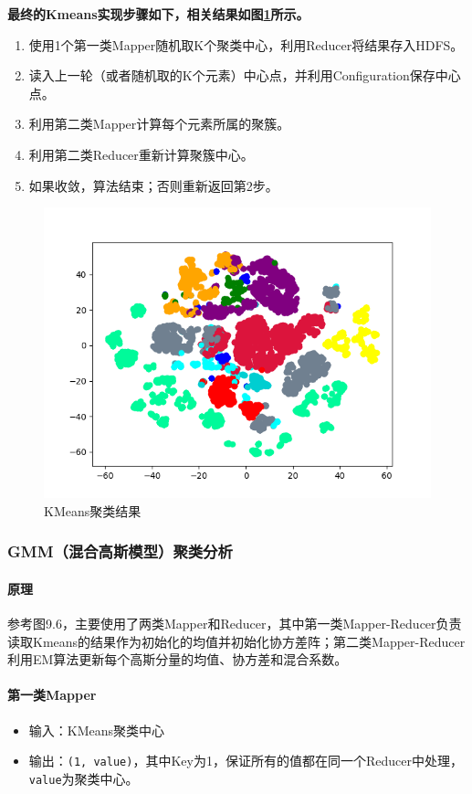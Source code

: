 \documentclass{ML}
\begin{document}
\textbf{最终的Kmeans实现步骤如下，相关结果如图\ref{fig:kmeans}所示。}
\begin{enumerate}
    \item 使用1个第一类Mapper随机取K个聚类中心，利用Reducer将结果存入HDFS。
    \item 读入上一轮（或者随机取的K个元素）中心点，并利用Configuration保存中心点。
    \item 利用第二类Mapper计算每个元素所属的聚簇。
    \item 利用第二类Reducer重新计算聚簇中心。
    \item 如果收敛，算法结束；否则重新返回第2步。
\end{enumerate}
\begin{figure}[hbt]
    \centering
    \includegraphics[width=0.8\linewidth]{media/cluster_1.png}
    \caption{KMeans聚类结果}\label{fig:kmeans}
\end{figure}
\subsubsection{GMM（混合高斯模型）聚类分析}
\paragraph{原理}
参考\cite{ml-book}图9.6，主要使用了两类Mapper和Reducer，其中第一类Mapper-Reducer负责读取Kmeans的结果作为初始化的均值并初始化协方差阵；第二类Mapper-Reducer利用EM算法更新每个高斯分量的均值、协方差和混合系数。

\paragraph{第一类Mapper}
\begin{itemize}
    \item 输入：KMeans聚类中心
    \item 输出：\texttt{(1, value)}，其中Key为1，保证所有的值都在同一个Reducer中处理，\texttt{value}为聚类中心。
\end{itemize}
\end{document}
